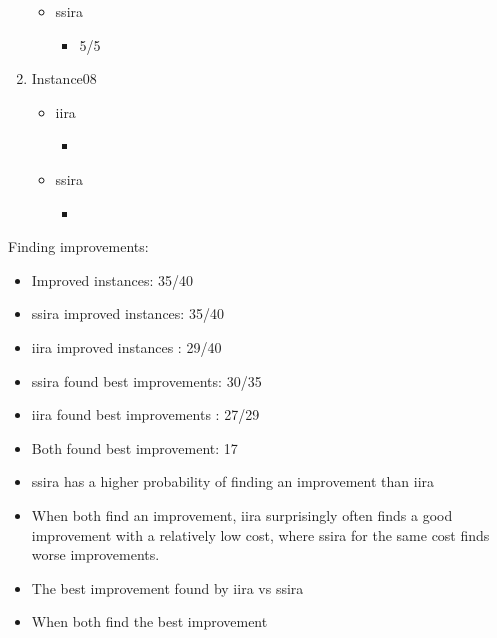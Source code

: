 \begin{enumerate}
\begin{itemize}
        \item \ac{ssira}
        \begin{itemize}
            \item 5/5
        \end{itemize}
    \end{itemize}

    \item Instance08
    \begin{itemize}
        \item \ac{iira}
        \begin{itemize}
            \item 
        \end{itemize}

        \item \ac{ssira}
        \begin{itemize}
            \item 
        \end{itemize}
    \end{itemize}
\end{enumerate}

Finding improvements:

\begin{itemize}
    \item Improved instances: 35/40
    \item \ac{ssira} improved instances: 35/40
    \item \ac{iira} improved instances : 29/40
    \item \ac{ssira} found best improvements: 30/35
    \item \ac{iira} found best improvements : 27/29
    \item Both found best improvement: 17
\end{itemize}

\begin{itemize}
    \item {}
        \ac{ssira} has a higher probability of finding an improvement than \ac{iira}
    \item {}
        When both find an improvement,
        \ac{iira} surprisingly often finds a good improvement with a relatively low cost,
        where \ac{ssira} for the same cost finds worse improvements.
    \item {} The best improvement found by \ac{iira} vs \ac{ssira}
    \item {} When both find the best improvement
\end{itemize}

